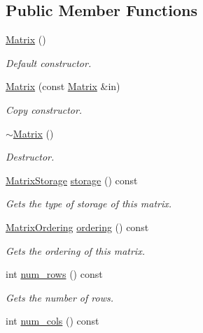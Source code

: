 \subsection*{Public Member Functions}
\begin{DoxyCompactItemize}
\item 
\hyperlink{classmtk_1_1Matrix_a04b8575764d3a649f21950c794f4cc02}{Matrix} ()
\begin{DoxyCompactList}\small\item\em Default constructor. \end{DoxyCompactList}\item 
\hyperlink{classmtk_1_1Matrix_ae532878cf9b34114f12a1f06701482aa}{Matrix} (const \hyperlink{classmtk_1_1Matrix}{Matrix} \&in)
\begin{DoxyCompactList}\small\item\em Copy constructor. \end{DoxyCompactList}\item 
\hyperlink{classmtk_1_1Matrix_a7dcc92fcf67904eaf17bb7b9d809f274}{$\sim$\-Matrix} ()
\begin{DoxyCompactList}\small\item\em Destructor. \end{DoxyCompactList}\item 
\hyperlink{group__c02-enums_ga25b67ec6a2afeee69f9bb196a9c66619}{Matrix\-Storage} \hyperlink{classmtk_1_1Matrix_a21893fc643eebadd9757c8995cf44dd3}{storage} () const 
\begin{DoxyCompactList}\small\item\em Gets the type of storage of this matrix. \end{DoxyCompactList}\item 
\hyperlink{group__c02-enums_ga622801bd9f912d0f976c3e383f5f581c}{Matrix\-Ordering} \hyperlink{classmtk_1_1Matrix_af675e480c7b94f194aadad316e53b002}{ordering} () const 
\begin{DoxyCompactList}\small\item\em Gets the ordering of this matrix. \end{DoxyCompactList}\item 
int \hyperlink{classmtk_1_1Matrix_a69feb30fc0018faee65fe9f7cb43e0ed}{num\-\_\-rows} () const 
\begin{DoxyCompactList}\small\item\em Gets the number of rows. \end{DoxyCompactList}\item 
int \hyperlink{classmtk_1_1Matrix_a1e52243fa290de6ee4bcc48cd1776a9a}{num\-\_\-cols} () const 

\end{DoxyCompactItemize}
